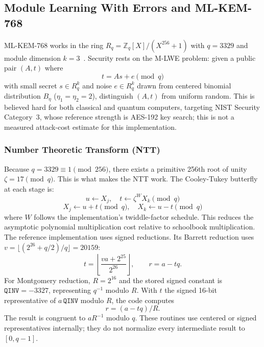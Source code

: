 \documentclass[journal, 10pt]{IEEEtran}
\begin{document}
\subsection{Module Learning With Errors and ML-KEM-768}
ML-KEM-768 works in the ring $R_q = \mathbb{Z}_q[X]/(X^{256} + 1)$ with $q = 3329$ and module dimension $k = 3$~\cite{b2}. Security rests on the M-LWE problem: given a public pair $(A, t)$ where
\begin{equation}
t = As + e \pmod{q}
\end{equation}
with small secret $s \in R_q^k$ and noise $e \in R_q^k$ drawn from centered binomial distribution $B_\eta$ ($\eta_1 = \eta_2 = 2$), distinguish $(A,t)$ from uniform random. This is believed hard for both classical and quantum computers, targeting NIST Security Category~3, whose reference strength is AES-192 key search; this is not a measured attack-cost estimate for this implementation.

\subsubsection{Number Theoretic Transform (NTT)}
Because $q = 3329 \equiv 1 \pmod{256}$, there exists a primitive 256th root of unity $\zeta = 17 \pmod{q}$. This is what makes the NTT work. The Cooley-Tukey butterfly at each stage is:
\begin{equation}
u \leftarrow X_j, \quad t \leftarrow \zeta^W X_k \pmod{q}
\end{equation}
\begin{equation}
X_j \leftarrow u + t \pmod{q}, \quad X_k \leftarrow u - t \pmod{q}
\end{equation}
where $W$ follows the implementation's twiddle-factor schedule. This reduces the asymptotic polynomial multiplication cost relative to schoolbook multiplication. The reference implementation uses signed reductions. Its Barrett reduction uses $v=\lfloor(2^{26}+q/2)/q\rfloor=20159$:
\begin{equation}
t=\left\lfloor\frac{va+2^{25}}{2^{26}}\right\rfloor,\qquad r=a-tq.
\end{equation}
For Montgomery reduction, $R=2^{16}$ and the stored signed constant is $\texttt{QINV}=-3327$, representing $q^{-1}$ modulo $R$. With $t$ the signed 16-bit representative of $a\,\texttt{QINV}$ modulo $R$, the code computes
\begin{equation}
r=(a-tq)/R.
\end{equation}
The result is congruent to $aR^{-1}$ modulo $q$. These routines use centered or signed representatives internally; they do not normalize every intermediate result to $[0,q-1]$.
\end{document}
